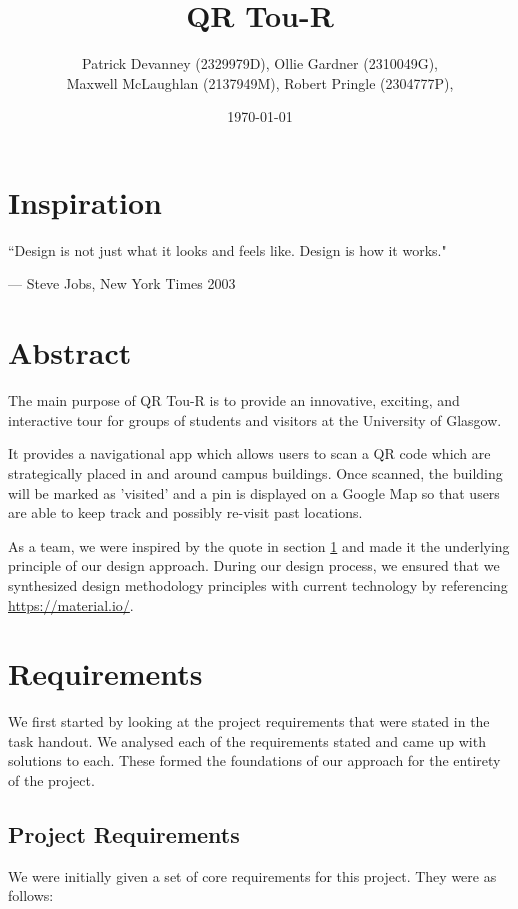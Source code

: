 \documentclass[a4,10pt,twocolumn]{article}
\author{
  Patrick Devanney (2329979D), Ollie Gardner (2310049G),\\
  Maxwell McLaughlan (2137949M), Robert Pringle (2304777P),\\ }
\title{QR Tou-R}
\date{\today} %
\begin{document}
\maketitle
\tableofcontents{}

\newpage{}

\section{Inspiration}
\label{sec:inspiration}

\epigraph{``Design is not just what it looks and feels like. Design is how it works."}{--- \textup{Steve Jobs}, New York Times 2003}

\section{Abstract} 
The main purpose of QR Tou-R is to provide an innovative, exciting, and interactive tour for groups of students and visitors at the University of Glasgow. 

It provides a navigational app which allows users to scan a QR code which are strategically placed in and around campus buildings. Once scanned, the building will be marked as 'visited' and a pin is displayed on a Google Map so that users are able to keep track and possibly re-visit past locations. 

As a team, we were inspired by the quote in section \ref{sec:inspiration} and made it the underlying principle of our design approach. During our design process, we ensured that we synthesized design methodology principles with current technology by referencing \url{https://material.io/}.

\section{Requirements}
We first started by looking at the project requirements that were stated in the task handout. We analysed each of the requirements stated and came up with solutions to each. These formed the foundations of our approach for the entirety of the project.

\subsection{Project Requirements}
We were initially given a set of core requirements for this project. They were as follows:
\end{document}
